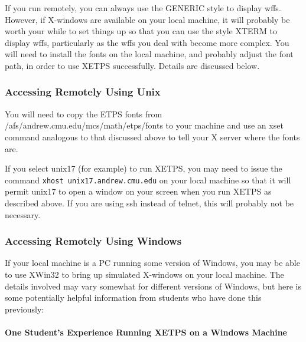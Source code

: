 \documentclass{article}
\begin{document}
If you run {\ETPS} remotely, you can always use the
GENERIC style to display wffs. However, if X-windows are available on
your local machine, it will probably be worth your while to set things up so
that you can use the style XTERM to display wffs, particularly as the
wffs you deal with become more complex. You will need to install the
fonts on the local machine, and probably adjust the font path, in
order to use XETPS successfully. Details are discussed below.


\subsubsection{Accessing {\ETPS} Remotely Using Unix}

You will need to copy the ETPS fonts from
/afs/andrew.cmu.edu/mcs/math/etps/fonts to your machine and use an
xset command analogous to that discussed above to tell your X server
where the fonts are.


If you select unix17 (for example) to run XETPS,
you may need to issue the command\newline{}
{\tt xhost unix17.andrew.cmu.edu}\newline{}
on your local machine  so that  it will permit unix17 to open a window on your screen
when you run XETPS as described above. If you are using ssh instead of
telnet, this will probably not be necessary.

\pagebreak

\subsubsection{Accessing {\ETPS} Remotely Using Windows}


If your local machine is a PC running some version of Windows, you may
be able to use XWin32 to bring up simulated X-windows on your local machine.
The details involved may vary somewhat for different versions of
Windows, but here is some potentially helpful information from
students who have done this previously:

\paragraph{One Student's Experience Running XETPS on a Windows Machine}
\end{document}
